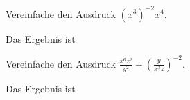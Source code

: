 \documentclass{ximera}
\begin{document}
\begin{question}
Vereinfache den Ausdruck ${(x^3)}^{-2} x^4.$
\begin{solution}
Das Ergebnis ist 
\end{solution}
\end{question}

\begin{question}
Vereinfache den Ausdruck $\frac{x^6z^2}{y^2} + \left(\frac{y}{x^3z}\right)^{-2}$.
\begin{solution}
Das Ergebnis ist 
\end{solution}
    
\end{question}
\end{document}
